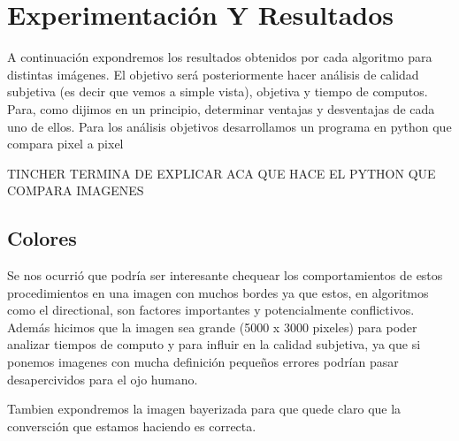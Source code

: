 \section{Experimentación Y Resultados}

A continuación expondremos los resultados obtenidos por cada algoritmo para distintas imágenes. El objetivo será posteriormente hacer análisis de calidad subjetiva (es decir que vemos a simple vista), objetiva y tiempo de computos. Para, como dijimos en un principio, determinar ventajas y desventajas de cada uno de ellos. Para los análisis objetivos desarrollamos un programa en python que compara pixel a pixel

TINCHER TERMINA DE EXPLICAR ACA QUE HACE EL PYTHON QUE COMPARA IMAGENES

\subsection{Colores}

Se nos ocurrió que podría ser interesante chequear los comportamientos de estos procedimientos en una imagen con muchos bordes ya que estos, en algoritmos como el directional, son factores importantes y potencialmente conflictivos. Además hicimos que la imagen sea grande (5000 x 3000 pixeles) para poder analizar tiempos de computo y para influir en la calidad subjetiva, ya que si ponemos imagenes con mucha definición pequeños errores podrían pasar desapercividos para el ojo humano.

Tambien expondremos la imagen bayerizada para que quede claro que la conversción que estamos haciendo es correcta.

